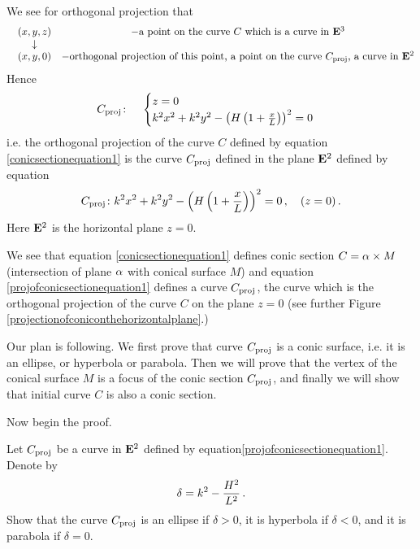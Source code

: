 \documentclass[12pt]{article}
\numberwithin{equation}{section}
\begin{document}
We see for orthogonal projection that
                \begin{equation*}
                    \begin{matrix}
&(x,y,z)&-\hbox {a point on the curve $C$ which is a curve in ${\bf E}^3$}\cr
       &\downarrow\cr 
&(x,y,0)&-\hbox {orthogonal projection of this point,
           a point on the curve $C_{\rm proj}$, a curve in ${\bf E}^2$}\cr
                   \end{matrix} 
             \end{equation*}
Hence
            \begin{equation*}\label{projofconicsectionequation1}
C_{\rm proj}\colon\quad \begin{cases}
      z=0\cr
      k^2x^2+k^2y^2-
   \left(H\left(1+{x\over L}\right)\right)^2=0\cr    
      \end{cases}
           \end{equation*}
i.e. the orthogonal projection of the curve $C$
defined by equation \eqref{conicsectionequation1}
is the curve $C_{\rm proj}$ defined in the plane ${\bf E}^2$ defined
by equation
             \begin{equation}\label{projofconicsectionequation1}
C_{\rm proj}\colon k^2x^2+k^2y^2-
   \left(H\left(1+{x\over L}\right)\right)^2=0\,,\quad
(z=0)\,.
           \end{equation}
Here  ${\bf E}^2$ is the horizontal plane $z=0$.


    We see that equation \eqref{conicsectionequation1} 
defines conic section 
$C=\alpha\times M$ (intersection of plane $\alpha$ 
with conical surface 
$M$)
and equation \eqref{projofconicsectionequation1} 
defines a curve $C_{\rm proj}$,
 the curve which is the
orthogonal projection of the curve $C$ on the plane $z=0$
(see further Figure 
\eqref{projectionofconiconthehorizontalplane}.)

   Our plan is following. 
We first prove that curve
$C_{\rm proj}$ is a conic surface,
i.e. it is an ellipse, or hyperbola or parabola.
Then we will prove that the vertex of the conical surface
$M$ is a focus of the  conic section $C_{\rm proj}$,
and finally we will show that initial curve
$C$ is also a conic section. 


Now begin the proof.



Let $C_{\rm proj}$ be a curve
in ${\bf E}^2$ defined by  
equation\eqref{projofconicsectionequation1}.
Denote by 
      \begin{equation*}
     \delta=k^2-{H^2\over L^2}\,.
           \end{equation*}
Show that the curve $C_{\rm proj}$ is an ellipse if $\delta>0$,
 it is
hyperbola if $\delta<0$, and it is parabola
if $\delta=0$.
\end{document}
